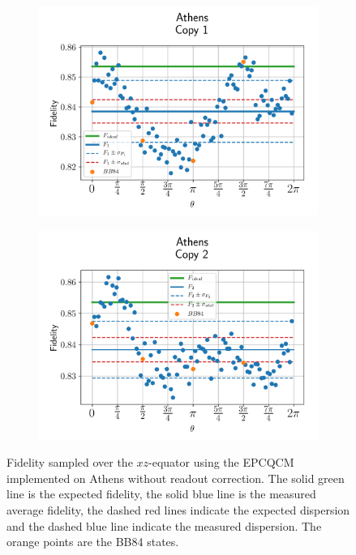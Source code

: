 \begin{figure}[H]
  \centering
  \begin{subfigure}{.5\textwidth}
    \centering
    \includegraphics[width=\textwidth]{Figures/Economical/IBM/OnlyEquator/results_athens_copy1.png}
    \label{fig:epc_uncorrected_athens_equator_1}
  \end{subfigure}%
  \begin{subfigure}{.5\textwidth}
    \centering
    \includegraphics[width=\textwidth]{Figures/Economical/IBM/OnlyEquator/results_athens_copy2.png}
    \label{fig:epc_uncorrected_athens_equator_2}
  \end{subfigure}
  \vspace{-0.5cm}
  \caption{Fidelity sampled over the $xz$-equator using the EPCQCM implemented on Athens without readout correction. The solid green line is the expected fidelity, the solid blue line is the measured average fidelity, the dashed red lines indicate the expected dispersion and the dashed blue line indicate the measured dispersion. The orange points are the BB84 states.}
  \label{fig:epc_uncorrected_athens_equator}
\end{figure}


